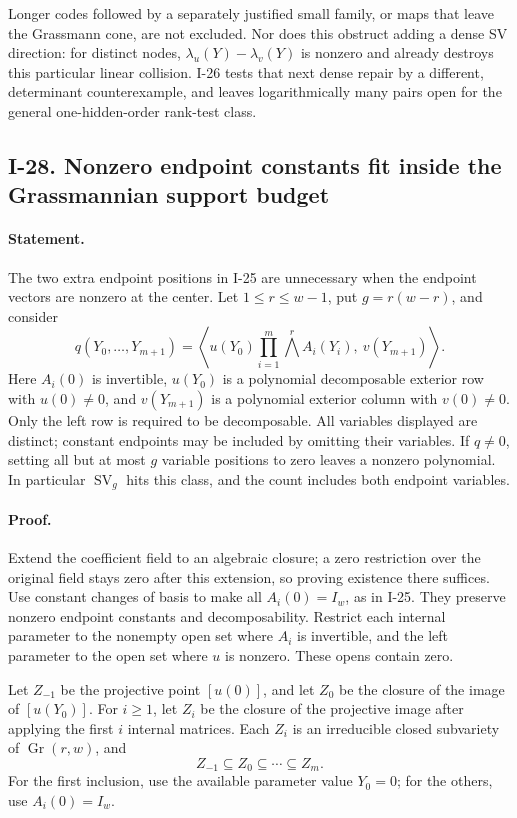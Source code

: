 Longer codes followed by a separately justified small family,
or maps that leave the Grassmann cone, are not excluded.
Nor does this obstruct adding a dense SV direction: for
distinct nodes, $\lambda_u(Y)-\lambda_v(Y)$ is nonzero and
already destroys this particular linear collision.  I-26
tests that next dense repair by a different, determinant
counterexample, and leaves logarithmically many pairs open
for the general one-hidden-order rank-test class.


\subsection{I-28. Nonzero endpoint constants fit inside the Grassmannian support budget}
\label{I-28}

\paragraph{Statement.}
The two extra endpoint positions in I-25 are unnecessary when
the endpoint vectors are nonzero at the center.  Let
$1\le r\le w-1$, put $g=r(w-r)$, and consider
\[
 q(Y_0,\ldots,Y_{m+1})
 =\left\langle u(Y_0)
       \prod_{i=1}^m\bigwedge^r A_i(Y_i),\ v(Y_{m+1})\right\rangle.
 \tag{I.39}
\]
Here $A_i(0)$ is invertible, $u(Y_0)$ is a polynomial
decomposable exterior row with $u(0)\ne0$, and $v(Y_{m+1})$
is a polynomial exterior column with $v(0)\ne0$.
Only the left row is required to be decomposable.
All variables displayed are distinct; constant endpoints may
be included by omitting their variables.
If $q\ne0$, setting all but at most $g$ variable positions
to zero leaves a nonzero polynomial.  In particular
$\operatorname{SV}_{g}$ hits this class, and the count includes
both endpoint variables.

\paragraph{Proof.}
Extend the coefficient field to an algebraic closure; a zero
restriction over the original field stays zero after this
extension, so proving existence there suffices.  Use constant
changes of basis to make all $A_i(0)=I_w$, as in I-25.
They preserve nonzero endpoint constants and decomposability.
Restrict each internal parameter to the nonempty open set
where $A_i$ is invertible, and the left parameter to the open
set where $u$ is nonzero.  These opens contain zero.

Let $Z_{-1}$ be the projective point $[u(0)]$, and let $Z_0$
be the closure of the image of $[u(Y_0)]$.  For $i\ge1$,
let $Z_i$ be the closure of the projective image after applying
the first $i$ internal matrices.  Each $Z_i$ is an irreducible
closed subvariety of $\operatorname{Gr}(r,w)$, and
\[
 Z_{-1}\subseteq Z_0\subseteq\cdots\subseteq Z_m.
\]
For the first inclusion, use the available parameter value
$Y_0=0$; for the others, use $A_i(0)=I_w$.

